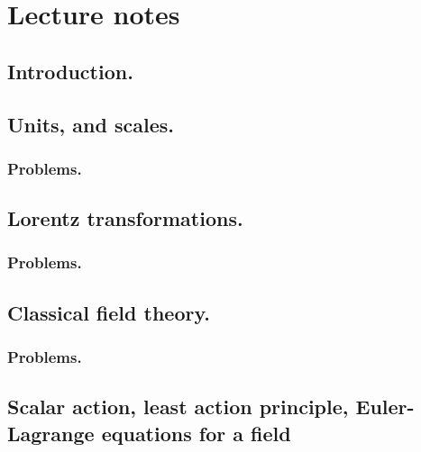 %
%
\part{Lecture notes}
   \chapter{Introduction.}
      
   \chapter{Units, and scales.}
      
      \section{Problems.}
         
         
   \chapter{Lorentz transformations.}
      
      
      \section{Problems.}
         
   \chapter{Classical field theory.}
      
      \section{Problems.}
         
         
         
         
   \chapter{Scalar action, least action principle, Euler-Lagrange equations for a field}
      
